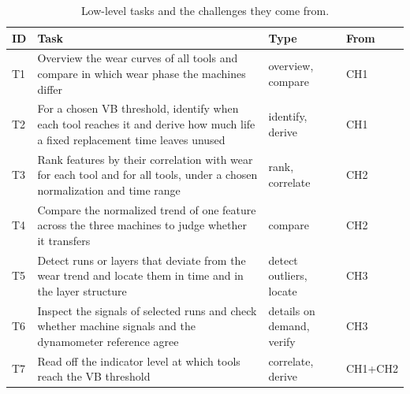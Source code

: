 \begin{table}[t]
\centering\small
\caption{Low-level tasks and the challenges they come from.}
\label{tab:tasks}
\begin{tabularx}{\linewidth}{@{}lXll@{}}
\toprule
ID & Task & Type & From \\
\midrule
T1 & Overview the wear curves of all tools and compare in which wear phase the machines differ & overview, compare & CH1 \\
T2 & For a chosen VB threshold, identify when each tool reaches it and derive how much life a fixed replacement time leaves unused & identify, derive & CH1 \\
T3 & Rank features by their correlation with wear for each tool and for all tools, under a chosen normalization and time range & rank, correlate & CH2 \\
T4 & Compare the normalized trend of one feature across the three machines to judge whether it transfers & compare & CH2 \\
T5 & Detect runs or layers that deviate from the wear trend and locate them in time and in the layer structure & detect outliers, locate & CH3 \\
T6 & Inspect the signals of selected runs and check whether machine signals and the dynamometer reference agree & details on demand, verify & CH3 \\
T7 & Read off the indicator level at which tools reach the VB threshold & correlate, derive & CH1+CH2 \\
\bottomrule
\end{tabularx}
\end{table}

